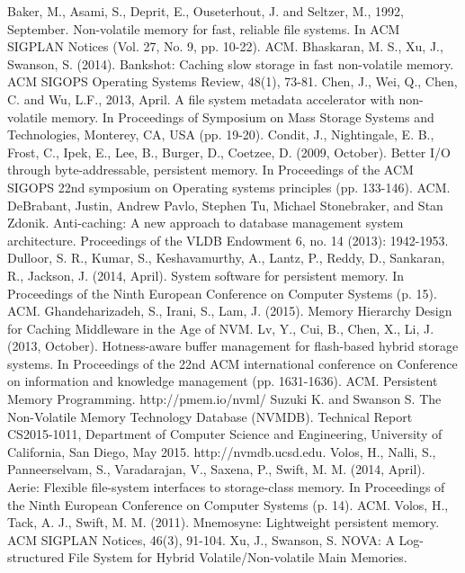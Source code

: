 \begin{thebibliography}{99}
 Baker, M., Asami, S., Deprit, E., Ouseterhout, J. and Seltzer, M., 1992, September. Non-volatile memory for fast, reliable file systems. In ACM SIGPLAN Notices (Vol. 27, No. 9, pp. 10-22). ACM.
 Bhaskaran, M. S., Xu, J., Swanson, S. (2014). Bankshot: Caching slow storage in fast non-volatile memory. ACM SIGOPS Operating Systems Review, 48(1), 73-81.	
 Chen, J., Wei, Q., Chen, C. and Wu, L.F., 2013, April. A file system metadata accelerator with non-volatile memory. In Proceedings of Symposium on Mass Storage Systems and Technologies, Monterey, CA, USA (pp. 19-20).
 Condit, J., Nightingale, E. B., Frost, C., Ipek, E., Lee, B., Burger, D.,  Coetzee, D. (2009, October). Better I/O through byte-addressable, persistent memory. In Proceedings of the ACM SIGOPS 22nd symposium on Operating systems principles (pp. 133-146). ACM.
 DeBrabant, Justin, Andrew Pavlo, Stephen Tu, Michael Stonebraker, and Stan Zdonik. Anti-caching: A new approach to database management system architecture. Proceedings of the VLDB Endowment 6, no. 14 (2013): 1942-1953.
 Dulloor, S. R., Kumar, S., Keshavamurthy, A., Lantz, P., Reddy, D., Sankaran, R., Jackson, J. (2014, April). System software for persistent memory. In Proceedings of the Ninth European Conference on Computer Systems (p. 15). ACM.
 Ghandeharizadeh, S., Irani, S., Lam, J. (2015). Memory Hierarchy Design for Caching Middleware in the Age of NVM.
 Lv, Y., Cui, B., Chen, X., Li, J. (2013, October). Hotness-aware buffer management for flash-based hybrid storage systems. In Proceedings of the 22nd ACM international conference on Conference on information and knowledge management (pp. 1631-1636). ACM.	
 Persistent Memory Programming. http://pmem.io/nvml/
 Suzuki K. and Swanson S. The Non-Volatile Memory Technology Database (NVMDB). Technical Report CS2015-1011, Department of Computer Science and Engineering, University of California, San Diego, May 2015. http://nvmdb.ucsd.edu.
 Volos, H., Nalli, S., Panneerselvam, S., Varadarajan, V., Saxena, P., Swift, M. M. (2014, April). Aerie: Flexible file-system interfaces to storage-class memory. In Proceedings of the Ninth European Conference on Computer Systems (p. 14). ACM.
 Volos, H., Tack, A. J., Swift, M. M. (2011). Mnemosyne: Lightweight persistent memory. ACM SIGPLAN Notices, 46(3), 91-104.	
 Xu, J., Swanson, S. NOVA: A Log-structured File System for Hybrid Volatile/Non-volatile Main Memories.
\end{thebibliography}


